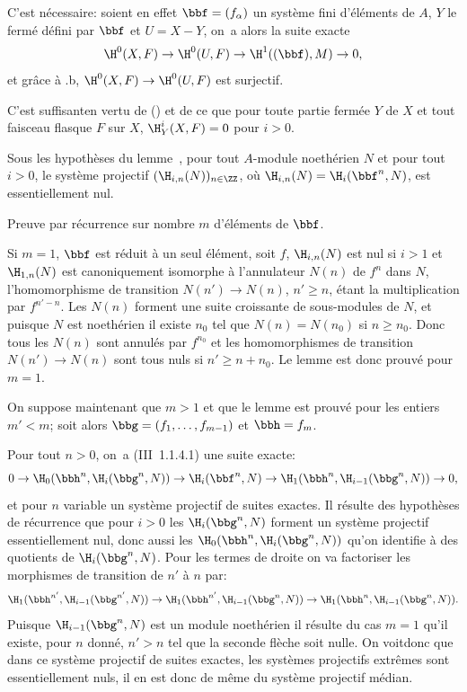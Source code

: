 C'est n\'ecessaire: soient en effet $\bbf=(f_{\alpha})$ un syst\`eme fini d'\'el\'ements de $A$, $Y$ le ferm\'e d\'efini par $\bbf$ et $U=X-Y$, on~a alors la suite exacte
\begin{equation*} \H^0(X, F) \to \H^0(U, F) \to \H^1((\bbf), M) \to 0,
\end{equation*}
et gr\^ace \`a .b, $\H^0(X, F)\to\H^0(U, F)$ est surjectif.

C'est suffisant\pageoriginale en vertu de () et de ce que pour toute partie ferm\'ee $Y$ de $X$ et tout faisceau flasque $F$ sur $X$, $\H_Y^i(X, F)=0$ pour $i>0$.

\begin{suplemme} \label{II.11} Sous les hypoth\`eses du lemme~, pour tout $A$-module noeth\'erien $N$ et pour tout $i>0$, le syst\`eme projectif $(\H_{i, n}(N))_{n\in\ZZ}$, o\`u $\H_{i, n}(N)=\H_i(\bbf^n, N)$, est essentiellement nul.
\end{suplemme}

Preuve par r\'ecurrence sur \ignorespaces nombre $m$ d'\'el\'ements de $\bbf$.

Si $m=1$, $\bbf$ est r\'eduit \`a un seul \'el\'ement, soit $f$, $\H_{i, n}(N)$ est nul si $i>1$ et $\H_{1, n}(N)$ est canoniquement isomorphe \`a l'annulateur $N(n)$ de $f^n$ dans $N$, l'homomorphisme de transition $N(n')\to N(n)$, $n'\geq n$, \'etant la multiplication par $f^{n'-n}$. Les $N(n)$ forment une suite croissante de sous-modules de $N$, et puisque $N$ est noeth\'erien il existe $n_0$ tel que $N(n)=N(n_0)$ si $n\geq n_0$. Donc tous les $N(n)$ sont annul\'es par $f^{n_0}$ et les homomorphismes de transition $N(n')\to N(n)$ sont tous nuls si $n'\geq n+n_0$. Le lemme est donc prouv\'e pour $m=1$.

On suppose maintenant que $m>1$ et que le lemme est prouv\'e pour les entiers $m'<m$; soit alors $\bbg=(f_1, \ldots, f_{m-1})$ et $\bbh=f_m$.

Pour tout $n>0$, on~a (\EGA III~1.1.4.1) une suite exacte:
\begin{equation*}
0 \to \H_0(\bbh^n, \H_i(\bbg^n, N)) \to \H_i(\bbf^n, N) \to \H_1(\bbh^n, \H_{i-1}(\bbg^n, N)) \to 0,
\end{equation*}
et pour $n$ variable un syst\`eme projectif de suites exactes. Il r\'esulte des hypoth\`eses de r\'ecurrence que pour $i>0$ les $\H_i(\bbg^n, N)$ forment un syst\`eme projectif essentiellement nul, donc aussi les $\H_0(\bbh^n, \H_i(\bbg^n, N))$ qu'on identifie \`a des quotients de $\H_i(\bbg^n, N)$. Pour les termes de droite on va factoriser les morphismes de transition de $n'$ \`a $n$ par:
\begin{equation*}
\H_1(\bbh^{n'}, \H_{i-1}(\bbg^{n'}, N)) \to \H_1(\bbh^{n'}, \H_{i-1}(\bbg^{n}, N)) \to \H_1(\bbh^{n}, \H_{i-1}(\bbg^{n}, N)).
\end{equation*}
Puisque $\H_{i-1}(\bbg^{n}, N)$ est un module noeth\'erien il r\'esulte du cas $m=1$ qu'il existe, pour $n$ donn\'e, $n'>n$ tel que la seconde fl\`eche soit nulle. On voit\pageoriginale donc que dans ce syst\`eme projectif de suites exactes, les syst\`emes projectifs extr\^emes sont essentiellement nuls, il en est donc de m\^eme du syst\`eme projectif m\'edian.

